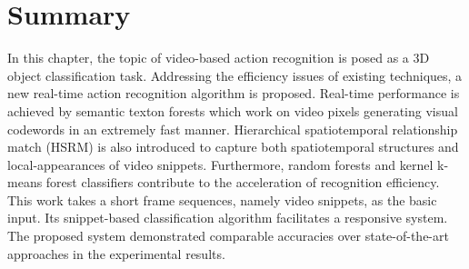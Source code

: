 \section{Summary}
\label{sec/act/discussion}
In this chapter, the topic of video-based action recognition is posed as a 3D object classification task. 
Addressing the efficiency issues of existing techniques, a new real-time action recognition algorithm is proposed. 
Real-time performance is achieved by semantic texton forests which work on video pixels generating visual codewords in an extremely fast manner. Hierarchical spatiotemporal relationship match (HSRM) is also introduced to capture both spatiotemporal structures and local-appearances of video snippets. 
Furthermore, random forests and kernel k-means forest classifiers contribute to the acceleration of recognition efficiency. 
This work takes a short frame sequences, namely video snippets, as the basic input. Its snippet-based classification algorithm facilitates a responsive system. 
The proposed system demonstrated comparable accuracies over state-of-the-art approaches in the experimental results. 
